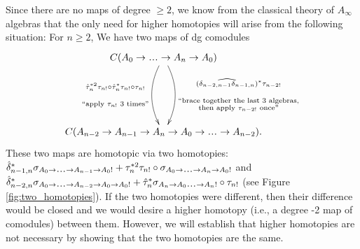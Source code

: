 Since there are no maps of degree 
$\geq2$, we know from the classical 
theory of $A_\infty$ algebras that 
the only need for higher homotopies 
will arise from the following 
situation: For $n\geq2$, 
We have two maps of dg comodules
$$
\xymatrixrowsep{5pc}
\xymatrix{
C(A_0 \to \smdots \to A_n \to A_0) 
 \ar@/^1pc/[d]^{\substack{
   (\widehat{\delta_{n-2,n-1}\delta_{n-1,n}})^*
   \tau_{n-2!}\\\\\\
   \textrm{``brace together the last 3 algebras,}\\
   \textrm{then apply $\tau_{n-2!}$ once''}}}
 \ar@/_1pc/[d]_{\substack{
   \hat{\tau}_n^{*2} \tau_{n!}\circ
   \hat{\tau}_n^*\tau_{n!}\circ \tau_{n!}\\\\\\
   \textrm{``apply $\tau_{n!}$ 3 times''}}}\\
C(A_{n-2} \to A_{n-1} \to A_n \to 
A_0 \to \smdots \to A_{n-2}).
}
$$
These two maps are homotopic via 
two homotopies: 
$\hat{\delta}_{n-1,n}^*
\sigma_{A_0 \to \smdots \to A_{n-1}\to A_0!}
+ \tau_n^{*2}\tau_{n!} \circ 
\sigma_{A_0 \to \smdots \to A_n\to A_0!}$ 
and 
$\hat{\delta}_{n-2,n}^*
\sigma_{A_0 \to \smdots \to A_{n-2}\to A_0 \to A_0!} +
\hat{\tau}_n^*\sigma_{A_n \to A_0 \smdots \to A_n!}
\circ \tau_{n!}$ (see Figure 
\ref{fig:two_homotopies}). If the 
two homotopies were different, then 
their difference would be closed and
we would desire a higher homotopy (i.e., 
a degree -2 map of comodules) between 
them. However, we will establish that 
higher homotopies are not necessary 
by showing that the two homotopies 
are the same.
%
